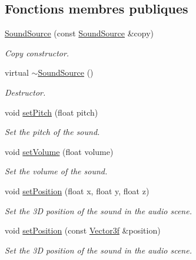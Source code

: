 \subsection*{Fonctions membres publiques}
\begin{DoxyCompactItemize}
\item 
\hyperlink{classsf_1_1SoundSource_ae0c7728c1449fdebe65749ab6fcb3170}{Sound\+Source} (const \hyperlink{classsf_1_1SoundSource}{Sound\+Source} \&copy)
\begin{DoxyCompactList}\small\item\em Copy constructor. \end{DoxyCompactList}\item 
\mbox{\label{classsf_1_1SoundSource_a77c7c1524f8cb81df2de9375b0f87c5c}} 
virtual \hyperlink{classsf_1_1SoundSource_a77c7c1524f8cb81df2de9375b0f87c5c}{$\sim$\+Sound\+Source} ()
\begin{DoxyCompactList}\small\item\em Destructor. \end{DoxyCompactList}\item 
void \hyperlink{classsf_1_1SoundSource_a72a13695ed48b7f7b55e7cd4431f4bb6}{set\+Pitch} (float pitch)
\begin{DoxyCompactList}\small\item\em Set the pitch of the sound. \end{DoxyCompactList}\item 
void \hyperlink{classsf_1_1SoundSource_a2f192f2b49fb8e2b82f3498d3663fcc2}{set\+Volume} (float volume)
\begin{DoxyCompactList}\small\item\em Set the volume of the sound. \end{DoxyCompactList}\item 
void \hyperlink{classsf_1_1SoundSource_a0480257ea25d986eba6cc3c1a6f8d7c2}{set\+Position} (float x, float y, float z)
\begin{DoxyCompactList}\small\item\em Set the 3D position of the sound in the audio scene. \end{DoxyCompactList}\item 
void \hyperlink{classsf_1_1SoundSource_a17ba9ed01925395652181a7b2a7d3aef}{set\+Position} (const \hyperlink{classsf_1_1Vector3}{Vector3f} \&position)
\begin{DoxyCompactList}\small\item\em Set the 3D position of the sound in the audio scene. \end{DoxyCompactList}\item 

\end{DoxyCompactItemize}
